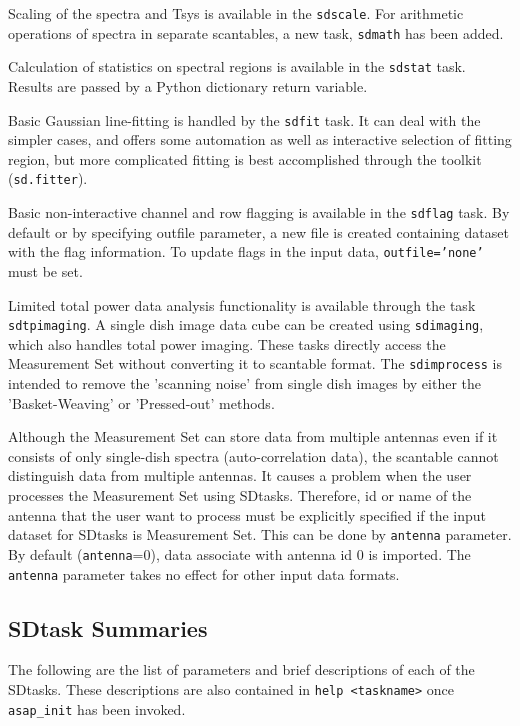 Scaling of the spectra and Tsys is available in the {\tt sdscale}.
For arithmetic operations of spectra in separate scantables, a new task, {\tt sdmath}
has been added. 

Calculation of statistics on spectral regions is available in the {\tt sdstat} task.
Results are passed by a Python dictionary return variable.

Basic Gaussian line-fitting is handled by the {\tt sdfit} task.  It can deal
with the simpler cases, and offers some automation as well as interactive 
selection of fitting region, but more complicated
fitting is best accomplished through the toolkit ({\tt sd.fitter}).

Basic non-interactive channel and row flagging is available in the {\tt sdflag} task.
By default or by specifying outfile parameter, a new file is created containing 
dataset with the flag information. To update flags in the input data,
{\tt outfile='none'} must be set.

Limited total power data analysis functionality is available through 
the task {\tt sdtpimaging}. A single dish image data cube can be created
using  {\tt sdimaging}, which also handles total power imaging.
These tasks directly access the Measurement Set without converting it to scantable format.
The {\tt sdimprocess} is intended to remove the 'scanning noise' from single dish
images by either the 'Basket-Weaving' or 'Pressed-out' methods.

Although the Measurement Set can store data from multiple antennas
even if it consists of only single-dish spectra (auto-correlation data),
the scantable cannot distinguish data from multiple antennas. It causes
a problem when the user processes the Measurement Set using SDtasks.
Therefore, id or name of the antenna that the user want to process
must be explicitly specified if the input dataset for SDtasks is
Measurement Set. This can be done by {\tt antenna} parameter. By default
({\tt antenna}=0), data associate with antenna id 0 is imported.
The {\tt antenna} parameter takes no effect for other input data formats.
\subsection{SDtask Summaries}
\label{section:sd.sdtasks.tasks}

The following are the list of parameters and
brief descriptions of each of the SDtasks.
These descriptions are also contained in {\tt help <taskname>} once {\tt asap\_init} has been invoked.


